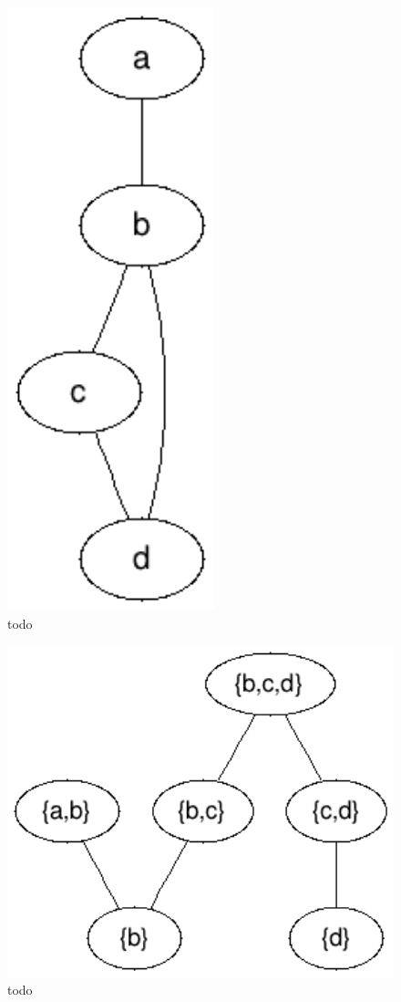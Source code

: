 \documentclass[a4paper,11pt,notitlepage]{report}
\theoremstyle{plain}
\theoremstyle{definition}
\begin{document}
\begin{figure}[here]
\centering
\includegraphics[width=6cm]{images/input_graph.png} 
\caption[todo]{todo}
\label{fig:arbitrary-graph}
\end{figure}

\begin{figure}[here]
\centering
\includegraphics[width=12cm]{images/nice_tree_decomp.png} 
\caption[todo]{todo}
\label{fig:decomp-graph}
\end{figure}
\end{document}
